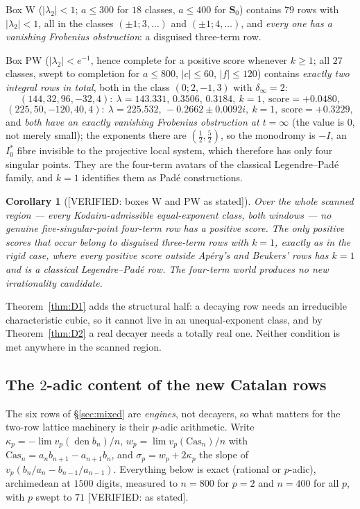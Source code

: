 \documentclass[11pt,reqno]{amsart}
\theoremstyle{plain}
\newtheorem{corollary}[theorem]{Corollary}
\theoremstyle{definition}
\theoremstyle{remark}
\theoremstyle{plain}
\newcommand{\Verified}[1]{\textup{\textsf{[VERIFIED: #1]}}}
\begin{document}
Box W ($|\lambda_2|<1$; $a\le300$ for $18$ classes, $a\le400$ for $\mathbf S_0$)
contains $79$ rows with $|\lambda_2|<1$, all in the classes $(\pm1;3,\ldots)$ and
$(\pm1;4,\ldots)$, and \emph{every one has a vanishing Frobenius obstruction}: a
disguised three-term row.

Box PW ($|\lambda_2|<e^{-1}$, hence complete for a positive score whenever
$k\ge1$; all $27$ classes, swept to completion for $a\le800$, $|c|\le60$,
$|f|\le120$) contains \emph{exactly two integral rows in total}, both in the
class $(0;2,-1,3)$ with $\delta_\infty=2$:
\[
(144,32,96,-32,4):\ \lambda=143.331,\,0.3506,\,0.3184,\ k=1,\ \text{score}=+0.0480,
\]
\[
(225,50,-120,40,4):\ \lambda=225.532,\,-0.2662\pm0.0092i,\ k=1,\ \text{score}=+0.3229,
\]
and \emph{both have an exactly vanishing Frobenius obstruction at $t=\infty$}
(the value is $0$, not merely small); the exponents there are
$(\tfrac12,\tfrac52)$, so the monodromy is $-I$, an $I_0^*$ fibre invisible to
the projective local system, which therefore has only four singular points. They
are the four-term avatars of the classical Legendre--Pad\'e family, and $k=1$
identifies them as Pad\'e constructions.

\begin{corollary}[\Verified{boxes W and PW as stated}]\label{cor:F6}
Over the whole scanned region --- every Kodaira-admissible equal-exponent class,
both windows --- \emph{no genuine five-singular-point four-term row has a
positive score}. The only positive scores that occur belong to disguised
three-term rows with $k=1$, exactly as in the rigid case, where every positive
score outside Ap\'ery's and Beukers' rows has $k=1$ and is a classical
Legendre--Pad\'e row. The four-term world produces no new irrationality
candidate.
\end{corollary}

Theorem~\ref{thm:D1} adds the structural half: a decaying row needs an
irreducible characteristic cubic, so it cannot live in an unequal-exponent class,
and by Theorem~\ref{thm:D2} a real decayer needs a totally real one. Neither
condition is met anywhere in the scanned region.

\subsection{The $2$-adic content of the new Catalan rows}\label{sec:2adic}
The six rows of \S\ref{sec:mixed} are \emph{engines}, not decayers, so what
matters for the two-row lattice machinery is their $p$-adic arithmetic. Write
$\kappa_p=-\lim v_p(\operatorname{den}b_n)/n$,
$w_p=\lim v_p(\mathrm{Cas}_n)/n$ with $\mathrm{Cas}_n=a_nb_{n+1}-a_{n+1}b_n$, and
$\sigma_p=w_p+2\kappa_p$ the slope of $v_p(b_n/a_n-b_{n-1}/a_{n-1})$. Everything
below is exact (rational or $p$-adic), archimedean at $1500$ digits, measured to
$n=800$ for $p=2$ and $n=400$ for all $p$, with $p$ swept to $71$
\Verified{as stated}.
\end{document}
